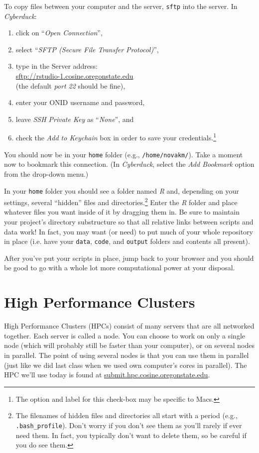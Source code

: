 \documentclass[12pt,letterpaper]{article}
\begin{document}
To copy files between your computer and the server, \texttt{sftp} into the server.
In \emph{Cyberduck}:
\begin{enumerate}
	\item click on ``\emph{Open Connection}'',
	\item select ``\emph{SFTP (Secure File Transfer Protocol)}'',
	\item type in the Server address:\\
		 \url{sftp://rstudio-1.cosine.oregonstate.edu}\\
		 (the default \emph{port 22} should be fine),
	\item enter your ONID username and password,
	\item leave \emph{SSH Private Key} as ``\emph{None}'', and
	\item check the \emph{Add to Keychain} box in order to save your credentials.\footnote{The option and label for this check-box may be specific to Macs.}
\end{enumerate}
\noindent
You should now be in your \texttt{home} folder (e.g., \texttt{/home/novakm/}).
Take a moment now to bookmark this connection.
(In \emph{Cyberduck}, select the \emph{Add Bookmark} option from the drop-down menu.)

In your \texttt{home} folder you should see a folder named \emph{R} and, depending on your settings,
several ``hidden'' files and directories.\footnote{The filenames of hidden files and directories all start with a period (e.g., \texttt{.bash\_profile}).
Don't worry if you don't see them as you'll rarely if ever need them.  In fact, you typically don't want to delete them, so be careful if you do see them.}
Enter the \emph{R} folder and place whatever files you want inside of it by dragging them in.
Be sure to maintain your project's directory substructure so that all relative links between scripts and data work!
In fact, you may want (or need) to put much of your whole repository in place (i.e. have your \texttt{data}, \texttt{code}, and \texttt{output} folders and contents all present).


After you've put your scripts in place, jump back to your browser and you should be good to go with a whole lot more computational power at your disposal.


\section{High Performance Clusters}

High Performance Clusters (HPCs) consist of many servers that are all 
networked together.
Each server is called a node.
You can choose to work on only a single node (which will probably still be faster than your computer), or on several nodes in parallel.
The point of using several nodes is that you can use them in parallel (just like we did last class when we used own computer's cores in parallel).
The HPC we'll use today is found at \url{submit.hpc.cosine.oregonstate.edu}.
\end{document}
